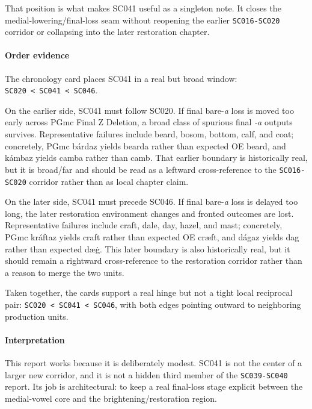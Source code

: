 \documentclass[
  british,
  a4paper,
]{article}
\begin{document}
That position is what makes SC041 useful as a singleton note. It closes
the medial-lowering/final-loss seam without reopening the earlier
\texttt{SC016-SC020} corridor or collapsing into the later restoration
chapter.

\paragraph{Order evidence}\label{order-evidence-25}

The chronology card places SC041 in a real but broad window:
\texttt{SC020\ \textless{}\ SC041\ \textless{}\ SC046}.

On the earlier side, SC041 must follow SC020. If final bare-\emph{a}
loss is moved too early across PGmc Final Z Deletion, a broad class of
spurious final \emph{-a} outputs survives. Representative failures
include beard, bosom, bottom, calf, and coat; concretely, PGmc bárdaz
yields bearda rather than expected OE beard, and kámbaz yields camba
rather than camb. That earlier boundary is historically real, but it is
broad/far and should be read as a leftward cross-reference to the
\texttt{SC016-SC020} corridor rather than as local chapter claim.

On the later side, SC041 must precede SC046. If final bare-\emph{a} loss
is delayed too long, the later restoration environment changes and
fronted outcomes are lost. Representative failures include craft, dale,
day, hazel, and mast; concretely, PGmc kráftaz yields craft rather than
expected OE cræft, and dágaz yields dag rather than expected dæġ. This
later boundary is also historically real, but it should remain a
rightward cross-reference to the restoration corridor rather than a
reason to merge the two units.

Taken together, the cards support a real hinge but not a tight local
reciprocal pair: \texttt{SC020\ \textless{}\ SC041\ \textless{}\ SC046},
with both edges pointing outward to neighboring production units.

\paragraph{Interpretation}\label{interpretation-25}

This report works because it is deliberately modest. SC041 is not the
center of a larger new corridor, and it is not a hidden third member of
the \texttt{SC039-SC040} report. Its job is architectural: to keep a
real final-loss stage explicit between the medial-vowel core and the
brightening/restoration region.
\end{document}
